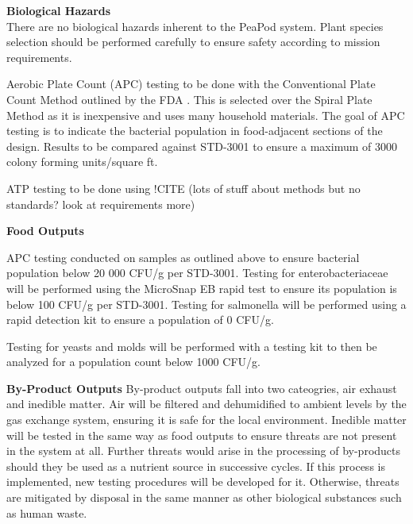 
\textbf{Biological Hazards}\\
There are no biological hazards inherent to the PeaPod system. Plant species selection should be performed carefully to ensure safety according to mission requirements.

Aerobic Plate Count (APC) testing to be done with the Conventional Plate Count Method outlined by the FDA \cite{platecount}. This is selected over the Spiral Plate Method as it is inexpensive and uses many household materials. The goal of APC testing is to indicate the bacterial population in food-adjacent sections of the design. Results to be compared against STD-3001 to ensure a maximum of 3000 colony forming units/square ft.

ATP testing to be done using !CITE (lots of stuff about methods but no standards? look at requirements more)

\textbf{Food Outputs}


APC testing conducted on samples as outlined above to ensure bacterial population below 20 000 CFU/g per STD-3001. Testing for enterobacteriaceae will be performed using the MicroSnap EB rapid test to ensure its population is below 100 CFU/g per STD-3001. Testing for salmonella will be performed using a rapid detection kit to ensure a population of 0 CFU/g.

Testing for yeasts and molds will be performed with a testing kit to then be analyzed for a population count below 1000 CFU/g.


\textbf{By-Product Outputs}
By-product outputs fall into two cateogries, air exhaust and inedible matter. Air will be filtered and dehumidified to ambient levels by the gas exchange system, ensuring it is safe for the local environment. Inedible matter will be tested in the same way as food outputs to ensure threats are not present in the system at all. Further threats would arise in the processing of by-products should they be used as a nutrient source in successive cycles. If this process is implemented, new testing procedures will be developed for it. Otherwise, threats are mitigated by disposal in the same manner as other biological substances such as human waste.

